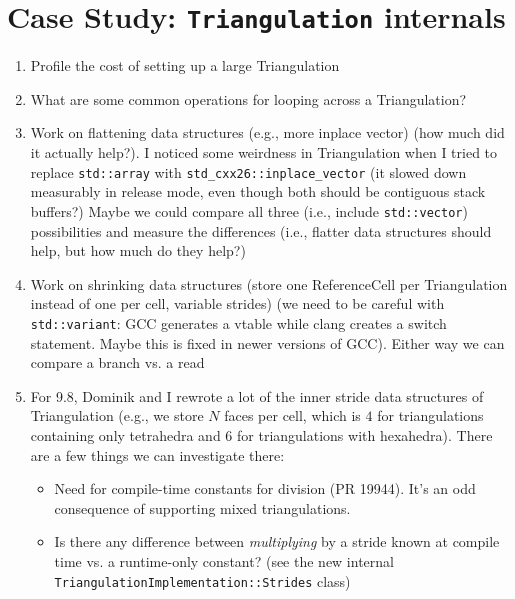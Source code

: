 \documentclass[11pt]{article}
\begin{document}
\section{Case Study: \texttt{Triangulation} internals}
\begin{enumerate}
  \item Profile the cost of setting up a large Triangulation

  \item What are some common operations for looping across a Triangulation?

  \item Work on flattening data structures (e.g., more inplace vector) (how much
    did it actually help?). I noticed some weirdness in Triangulation when I
    tried to replace \texttt{std::array} with
    \texttt{std\_cxx26::inplace\_vector} (it slowed down measurably in release
    mode, even though both should be contiguous stack buffers?) Maybe we could
    compare all three (i.e., include \texttt{std::vector}) possibilities and
    measure the differences (i.e., flatter data structures should help, but how
    much do they help?)

  \item Work on shrinking data structures (store one ReferenceCell per
    Triangulation instead of one per cell, variable strides) (we need to be
    careful with \texttt{std::variant}: GCC generates a vtable while clang
    creates a switch statement. Maybe this is fixed in newer versions of GCC).
    Either way we can compare a branch vs. a read

  \item For 9.8, Dominik and I rewrote a lot of the inner stride data structures
    of Triangulation (e.g., we store $N$ faces per cell, which is $4$ for
    triangulations containing only tetrahedra and $6$ for triangulations with
    hexahedra). There are a few things we can investigate there:

    \begin{itemize}
      \item Need for compile-time constants for division (PR 19944). It's an odd
        consequence of supporting mixed triangulations.

      \item Is there any difference between \emph{multiplying} by a stride known
        at compile time vs. a runtime-only constant? (see the new internal
        \texttt{TriangulationImplementation::Strides} class)
    \end{itemize}
\end{enumerate}
\end{document}
